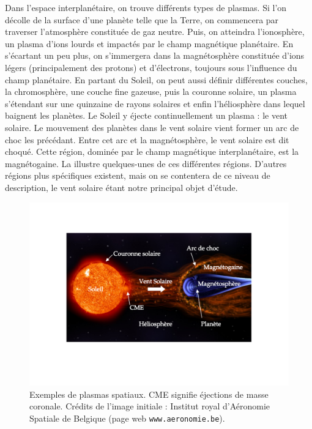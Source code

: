 Dans l'espace interplanétaire, on trouve différents types de plasmas. Si l'on décolle de la surface d'une planète telle que la Terre, on commencera par traverser l'atmosphère constituée de gaz neutre. Puis, on atteindra l'ionosphère, un plasma d'ions lourds et impactés par le champ magnétique planétaire. En s'écartant un peu plus, on s'immergera dans la magnétosphère constituée d'ions légers (principalement des protons) et d'électrons, toujours sous l'influence du champ planétaire. En partant du Soleil, on peut aussi définir différentes couches, la chromosphère, une couche fine gazeuse, puis la couronne solaire, un plasma s'étendant sur une quinzaine de rayons solaires et enfin l'héliosphère dans lequel baignent les planètes. Le Soleil y éjecte continuellement un plasma : le vent solaire.
Le mouvement des planètes dans le vent solaire vient former un arc de choc les précédant. Entre cet arc et la magnétosphère, le vent solaire est dit choqué. Cette région, dominée par le champ magnétique interplanétaire, est la magnétogaine. La  illustre quelques-unes de ces différentes régions. D'autres régions plus spécifiques existent, mais on se contentera de ce niveau de description, le vent solaire étant notre principal objet d'étude. 
\begin{figure}[!ht]
 \centering
\includegraphics[width=\linewidth,trim=4cm 5cm 4cm 4cm, clip=true]{./Part_0/images/schemes_heliosphere}
\cprotect\caption{Exemples de plasmas spatiaux. \acs{CME} signifie éjections de masse coronale. Crédits de l'image initiale : Institut royal d'Aéronomie Spatiale de Belgique (page web \verb|www.aeronomie.be|).}
\label{fig:régions}
\end{figure}

